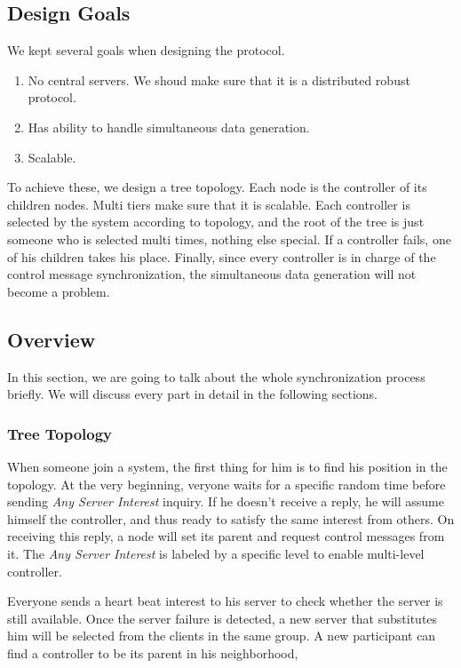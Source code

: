 \documentclass[conference]{IEEEtran}
\begin{document}
\subsection{Design Goals}
We kept several goals when designing the protocol.
\begin{enumerate}{}
	\item No central servers. We shoud make sure that it is a distributed robust protocol.
	\item Has ability to handle simultaneous data generation.
	\item Scalable.
\end{enumerate}

To achieve these, we design a tree topology. Each node is the controller of its children nodes.
Multi tiers make sure that it is scalable.
Each controller is selected by the system according to topology,
and the root of the tree is just someone who is selected multi times, nothing else special.
If a controller fails, one of his children takes his place.
Finally, since every controller is in charge of the control message synchronization,
the simultaneous data generation will not become a problem.

\subsection{Overview}

In this section, we are going to talk about the whole synchronization process briefly.
We will discuss every part in detail in the following sections.

\subsubsection{Tree Topology}
When someone join a system, the first thing for him is to find his position in the topology.
At the very beginning,
veryone waits for a specific random time before sending \emph{Any Server Interest} inquiry.
If he doesn't receive a reply, he will assume himself the controller,
and thus ready to satisfy the same interest from others.
On receiving this reply, a node will set its parent and request control messages from it.
The \emph{Any Server Interest} is labeled by a specific level to enable multi-level controller.

Everyone sends a heart beat interest to his server to check whether the server is still available.
Once the server failure is detected,
a new server that substitutes him will be selected from the clients in the same group.
A new participant can find a controller to be its parent in his neighborhood,
\end{document}
